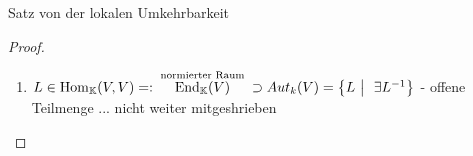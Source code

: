 \documentclass[class=article, crop=false]{standalone}
\begin{document}
\begin{zettel}{Satz von der lokalen Umkehrbarkeit}
\begin{proof}
\begin{enumerate}
		      $h = g(f(h)) = g(h + R(h)) = h + R(h) + S(h + R(h)) \implies R(h) = - S(h + R(h))$

		      Analog: $ R (g(k)) + S(k) \stackrel{\ast }{=} 0$. $\exists \delta_1 > 0 : \forall  h $
		      mit $\norm{h} \leq  \delta_1$ gilt $R(h) \leq  \frac{1}{2} \norm{h}$.
		      Aus $1.$ folgt $\exists  \delta_2 > 0 : \forall  k \tx{  mit }  \norm{k} < \delta_2$
		      gilt $\norm{g(k)} < \delta_1$ (Stetigkeit von $g$ )
		      $\ast $ : $ \norm{ S(k)} =  \norm{- R(g(k))} \leq  \frac{1}{2} \norm{g(k)}$
		      $ \implies  \norm{k} \geq  \norm{g(k) - S(k)} \geq  \frac{1}{2} \norm{g(k)}$
		      $\implies \norm{g(k)} \leq 2  \norm{k} \iff \frac{1}{\norm{k}} \stackrel{\ast \ast }{\leq} \frac{2}{ \norm{g(k)}}$

		      $\ast  \ast $ : nicht mehr mitgeshrieben. Wir folgern:
		      $\implies  \forall  b \in  B_{\delta}(o)$ ist $g$ an $b$ diffbar und $ (D_b g) = ( D_{g(b)} f )$
		\item $L \in  \Hom_\K(V,V) =: \stackrel{\tx{ normierter Raum } }{\End_ \K (V)} \supset Aut_k(V) = \set{L}{\exists L^{-1}}$ - offene Teilmenge ... nicht weiter mitgeshrieben
	\end{enumerate}

\end{proof}
\end{zettel}
\end{document}
